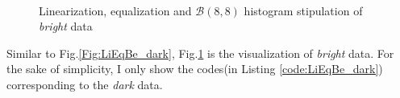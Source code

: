 \documentclass[conference,onecolumn]{IEEEtran}
\begin{document}
\begin{figure}[htb]
	\centering
	\ 
	\ 
	\caption{Linearization, equalization and $\mathcal{B}(8,8)$ histogram stipulation of \textit{bright} data}
	\label{Fig:LiEqBe_bright}
\end{figure}

\newpage
Similar to Fig.\ref{Fig:LiEqBe_dark}, Fig.\ref{Fig:LiEqBe_bright} is the visualization of \textit{bright} data. For the sake of simplicity, I only show the codes(in Listing \ref{code:LiEqBe_dark}) corresponding to the \textit{dark} data.
\end{document}
